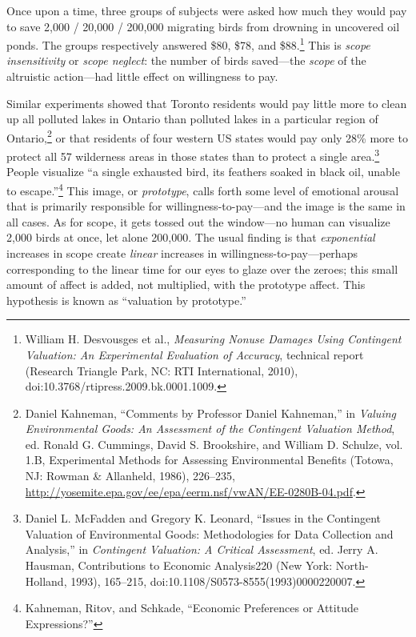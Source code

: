 

 Once upon a time, three groups of subjects were asked how much
they would pay to save 2,000 / 20,000 / 200,000 migrating birds from
drowning in uncovered oil ponds. The groups respectively answered \$80,
\$78, and \$88.\footnote{William H. Desvousges et al., \textit{Measuring Nonuse Damages
Using Contingent Valuation: An Experimental Evaluation of Accuracy},
technical report (Research Triangle Park, NC: RTI International, 2010),
doi:10.3768/rtipress.2009.bk.0001.1009.} This is \textit{scope insensitivity}
or \textit{scope neglect}: the number of birds saved---the
\textit{scope} of the altruistic action---had little effect on
willingness to pay. 


 Similar experiments showed that Toronto residents would pay little
more to clean up all polluted lakes in Ontario than polluted lakes in a
particular region of Ontario,\footnote{Daniel Kahneman, ``Comments by Professor
Daniel Kahneman,'' in \textit{Valuing Environmental
Goods: An Assessment of the Contingent Valuation Method}, ed. Ronald G.
Cummings, David S. Brookshire, and William D. Schulze, vol. 1.B,
Experimental Methods for Assessing Environmental Benefits (Totowa, NJ:
Rowman \& Allanheld, 1986), 226--235,
\url{http://yosemite.epa.gov/ee/epa/eerm.nsf/vwAN/EE-0280B-04.pdf}.} or that residents of
four western US states would pay only 28\% more to protect all 57
wilderness areas in those states than to protect a single
area.\footnote{Daniel L. McFadden and Gregory K. Leonard,
``Issues in the Contingent Valuation of Environmental
Goods: Methodologies for Data Collection and
Analysis,'' in \textit{Contingent Valuation: A
Critical Assessment}, ed. Jerry A. Hausman, Contributions to Economic
Analysis220 (New York: North-Holland, 1993), 165--215,
doi:10.1108/S0573-8555(1993)0000220007.} People visualize ``a single
exhausted bird, its feathers soaked in black oil, unable to
escape.''\footnote{Kahneman, Ritov, and Schkade, ``Economic
Preferences or Attitude Expressions?''} This image, or
\textit{prototype}, calls forth some level of emotional arousal that is
primarily responsible for willingness-to-pay---and the image is the
same in all cases. As for scope, it gets tossed out the window---no
human can visualize 2,000 birds at once, let alone 200,000. The usual
finding is that \textit{exponential} increases in scope create
\textit{linear} increases in willingness-to-pay---perhaps corresponding
to the linear time for our eyes to glaze over the zeroes; this small
amount of affect is added, not multiplied, with the prototype affect.
This hypothesis is known as ``valuation by
prototype.''


